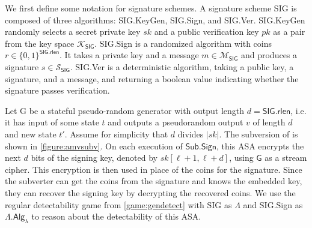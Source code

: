 We first define some notation for signature schemes. A signature scheme \textsf{SIG} is composed of three algorithms: \textsf{SIG.KeyGen}, \textsf{SIG.Sign}, and \textsf{SIG.Ver}. \textsf{SIG.KeyGen} randomly selects a secret private key $sk$ and a public verification key $pk$ as a pair from the key space $\mathcal{K}_\mathsf{SIG}$. \textsf{SIG.Sign} is a randomized algorithm with coins $r\in \{0,1\}^\mathsf{SIG.rlen}$. It takes a private key and a message $m\in \mathcal{M}_\mathsf{SIG}$ and produces a signature $s\in \mathcal{S}_\mathsf{SIG}$. \textsf{SIG.Ver} is a deterministic algorithm, taking a public key, a signature, and a message, and returning a boolean value indicating whether the signature passes verification.

Let \textsf{G} be a stateful pseudo-random generator with output length $d=\textsf{SIG.rlen}$, i.e. it has input of some state $t$ and outputs a pseudorandom output $v$ of length $d$ and new state $t'$. Assume for simplicity that $d$ divides $|sk|$. The subversion of \cite{CCS:AteMagVen15} is shown in \autoref{figure:amvsubv}. On each execution of $\mathsf{Sub.Sign}$, this ASA encrypts the next $d$ bits of the signing key, denoted by $sk[\ell + 1, \ell + d]$, using $\mathsf{G}$ as a stream cipher. This encryption is then used in place of the coins for the signature. Since the subverter can get the coins from the signature and knows the embedded key, they can recover the signing key by decrypting the recovered coins. We use the regular detectability game from \autoref{game:gendetect} with \textsf{SIG} as $\mathsf{\Lambda}$ and \textsf{SIG.Sign} as $\mathsf{\Lambda.Alg}_\lambda$ to reason about the detectability of this ASA.

